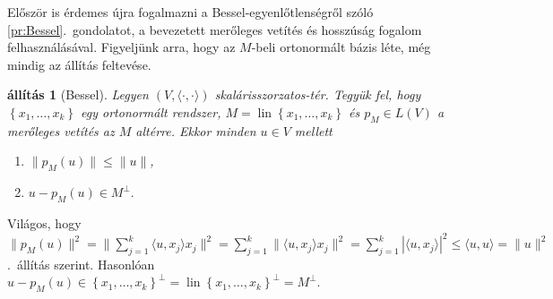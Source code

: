 \documentclass[a4paper, showtrims]{memoir}
\makeatletter
\renewenvironment{proof}[1][\proofname]
    {\par\pushQED{\qed}%
    \normalfont \topsep6\p@\@plus6\p@\relax
    \trivlist
    \item[\hskip\labelsep
        \itshape
    #1\@addpunct{:}]\ignorespaces}
    {\popQED\endtrivlist\@endpefalse}
\theoremstyle{plain}
\newtheorem{proposition}{állítás}[chapter]
\theoremstyle{remark}
\theoremstyle{definition}
\DeclareMathOperator{\lin}{lin}
\newcommand{\ip}[2]{\langle#1,#2\rangle}
\makeatother
\begin{document}
Először is érdemes újra fogalmazni a Bessel-egyenlőtlenségről szóló \ref{pr:Bessel}.~gondolatot,
a bevezetett merőleges vetítés és hosszúság fogalom felhasználásával.
Figyeljünk arra, hogy az $M$-beli ortonormált bázis léte, még mindig az állítás feltevése.
\begin{proposition}[Bessel]\label{pr:Bessel2}
	Legyen $\left( V,\ip{\cdot}{\cdot} \right)$ skalárisszorzatos-tér.
	Tegyük fel, hogy $\left\{ x_1,\ldots,x_k \right\}$ egy ortonormált rendszer,
	$M=\lin\left\{ x_1,\ldots,x_k \right\}$
	és $p_M\in L\left( V \right)$ a merőleges vetítés az $M$ altérre.
	Ekkor minden $u\in V$ mellett
	\begin{enumerate}
		\item
		      $\|p_M\left( u \right)\|\leq\|u\|$,
		\item
		      \(
		      u-p_M(u)\in M^\perp.
		      \)
		      \qedhere
	\end{enumerate}
\end{proposition}
\begin{proof}
	Világos, hogy
	$
		\|p_M\left( u \right)\|^2
		=
		\|\sum_{j=1}^k\ip{u}{x_j}x_j\|^2
		=
		\sum_{j=1}^k\|\ip{u}{x_j}x_j\|^2
		=
		\sum_{j=1}^k|\ip{u}{x_j}|^2
		\leq
		\ip{u}{u}
		=
		\|u\|^2
	$
	.~állítás szerint.
	Hasonlóan
	$
		u-p_M\left( u \right)\in \left\{ x_1,\ldots,x_k \right\}^\perp
		=
		\lin\left\{ x_1,\ldots,x_k \right\}^\perp
		=
		M^\perp.
	$
\end{proof}
\end{document}
